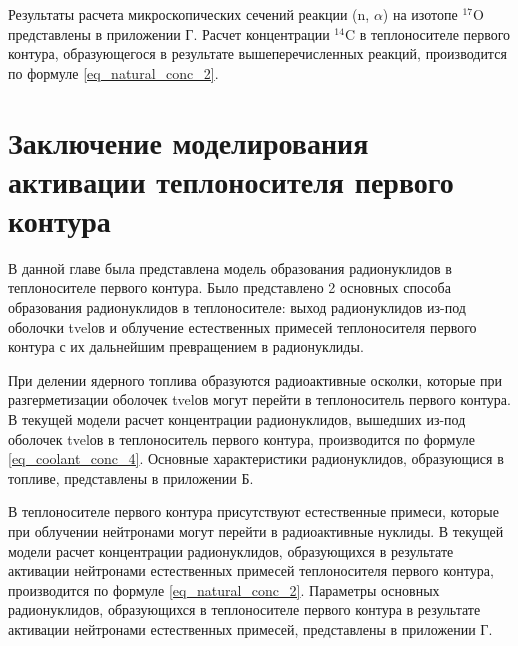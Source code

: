 Результаты расчета микроскопических сечений реакции (n, $\alpha$) на изотопе $^{17}\text{O}$ представлены в приложении 
Г. Расчет концентрации $^{14}\text{C}$ в теплоносителе первого контура, образующегося в результате вышеперечисленных 
реакций, производится по формуле \ref{eq_natural_conc_2}.

\section{Заключение моделирования активации теплоносителя первого контура}

В данной главе была представлена модель образования радионуклидов в теплоносителе первого контура. Было представлено 2 
основных способа образования радионуклидов в теплоносителе: выход радионуклидов из-под оболочки \ac{tvel}ов и облучение 
естественных примесей теплоносителя первого контура с их дальнейшим превращением в радионуклиды.

При делении ядерного топлива образуются радиоактивные осколки, которые при разгерметизации оболочек \ac{tvel}ов могут 
перейти в теплоноситель первого контура. В текущей модели расчет концентрации радионуклидов, вышедших из-под оболочек 
\ac{tvel}ов в теплоноситель первого контура, производится по формуле \ref{eq_coolant_conc_4}. Основные характеристики 
радионуклидов, образующися в топливе, представлены в приложении Б.

В теплоносителе первого контура присутствуют естественные примеси, которые при облучении нейтронами могут перейти в 
радиоактивные нуклиды. В текущей модели расчет концентрации радионуклидов, образующихся в результате активации 
нейтронами естественных примесей теплоносителя первого контура, производится по формуле \ref{eq_natural_conc_2}. 
Параметры основных радионуклидов, образующихся в теплоносителе первого контура в результате активации нейтронами 
естественных примесей, представлены в приложении Г.


